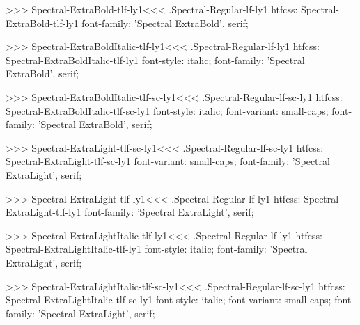 >>>
\<Spectral-ExtraBold-tlf-ly1\><<<
.Spectral-Regular-lf-ly1
htfcss:  Spectral-ExtraBold-tlf-ly1  font-family: 'Spectral ExtraBold', serif;

>>>
\<Spectral-ExtraBoldItalic-tlf-ly1\><<<
.Spectral-Regular-lf-ly1
htfcss:  Spectral-ExtraBoldItalic-tlf-ly1  font-style: italic; font-family: 'Spectral ExtraBold', serif;

>>>
\<Spectral-ExtraBoldItalic-tlf-sc-ly1\><<<
.Spectral-Regular-lf-sc-ly1
htfcss:  Spectral-ExtraBoldItalic-tlf-sc-ly1  font-style: italic; font-variant: small-caps; font-family: 'Spectral ExtraBold', serif;

>>>
\<Spectral-ExtraLight-tlf-sc-ly1\><<<
.Spectral-Regular-lf-sc-ly1
htfcss:  Spectral-ExtraLight-tlf-sc-ly1  font-variant: small-caps; font-family: 'Spectral ExtraLight', serif;

>>>
\<Spectral-ExtraLight-tlf-ly1\><<<
.Spectral-Regular-lf-ly1
htfcss:  Spectral-ExtraLight-tlf-ly1  font-family: 'Spectral ExtraLight', serif;

>>>
\<Spectral-ExtraLightItalic-tlf-ly1\><<<
.Spectral-Regular-lf-ly1
htfcss:  Spectral-ExtraLightItalic-tlf-ly1  font-style: italic; font-family: 'Spectral ExtraLight', serif;

>>>
\<Spectral-ExtraLightItalic-tlf-sc-ly1\><<<
.Spectral-Regular-lf-sc-ly1
htfcss:  Spectral-ExtraLightItalic-tlf-sc-ly1  font-style: italic; font-variant: small-caps; font-family: 'Spectral ExtraLight', serif;

